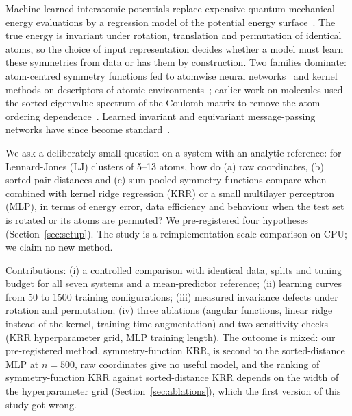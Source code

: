 Machine-learned interatomic potentials replace expensive quantum-mechanical energy evaluations by a regression model of the potential energy surface~\cite{unke2020machine}. The true energy is invariant under rotation, translation and permutation of identical atoms, so the choice of input representation decides whether a model must learn these symmetries from data or has them by construction. Two families dominate: atom-centred symmetry functions fed to atomwise neural networks~\cite{behler2007generalized,behler2011atom} and kernel methods on descriptors of atomic environments~\cite{bartk2012representing}; earlier work on molecules used the sorted eigenvalue spectrum of the Coulomb matrix to remove the atom-ordering dependence~\cite{rupp2011fast}. Learned invariant and equivariant message-passing networks have since become standard~\cite{schtt2017schnet,batzner2021e}.

We ask a deliberately small question on a system with an analytic reference: for Lennard-Jones (LJ) clusters of 5--13 atoms, how do (a) raw coordinates, (b) sorted pair distances and (c) sum-pooled symmetry functions compare when combined with kernel ridge regression (KRR) or a small multilayer perceptron (MLP), in terms of energy error, data efficiency and behaviour when the test set is rotated or its atoms are permuted? We pre-registered four hypotheses (Section~\ref{sec:setup}). The study is a reimplementation-scale comparison on CPU; we claim no new method.

Contributions: (i) a controlled comparison with identical data, splits and tuning budget for all seven systems and a mean-predictor reference; (ii) learning curves from 50 to 1500 training configurations; (iii) measured invariance defects under rotation and permutation; (iv) three ablations (angular functions, linear ridge instead of the kernel, training-time augmentation) and two sensitivity checks (KRR hyperparameter grid, MLP training length). The outcome is mixed: our pre-registered method, symmetry-function KRR, is second to the sorted-distance MLP at $n{=}500$, raw coordinates give no useful model, and the ranking of symmetry-function KRR against sorted-distance KRR depends on the width of the hyperparameter grid (Section~\ref{sec:ablations}), which the first version of this study got wrong.
